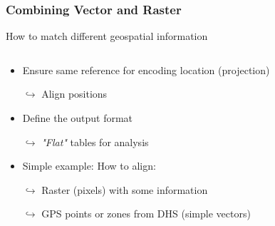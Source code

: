 \documentclass[xcolor=x11names,aspectratio=169, compress]{beamer}
\renewcommand{\(}{\begin{columns}}
\renewcommand{\)}{\end{columns}}
\newcommand{\<}[1]{\begin{column}{#1}}
\renewcommand{\>}{\end{column}}
\begin{document}
\begin{frame}
    \frametitle{Combining Vector and Raster }
How to match different geospatial information
    \begin{columns}[T]
        \begin{column}{0.6\textwidth}
            \begin{itemize}[<+->]
            \item Ensure same reference for encoding location (projection)
             \item[$\hookrightarrow$] Align positions
             \item Define the output format
             \item[$\hookrightarrow$] \emph{"Flat"} tables for analysis
             \item Simple example: How to align:
             \item[$\hookrightarrow$] Raster (pixels) with some information
             \item[$\hookrightarrow$] GPS points or zones from DHS (simple vectors)
             \item[]
            \end{itemize}
        \end{column}
        \begin{column}{0.4\textwidth}
        \begin{itemize}
             \item[]

\end{itemize}
\end{column}
\end{columns}
\end{frame}
\end{document}
